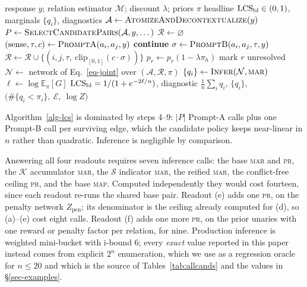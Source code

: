 \begin{algorithm}[t]
\caption{\textsc{ComputeLCS}$(y)$ --- the end-to-end coherence score.}
\label{alg-lcs}
\begin{algorithmic}[1]
\Require response $y$; relation estimator $\mathcal{M}$; discount $\lambda$; priors $\pi$
\Ensure headline $\mathrm{LCS}_{\mathrm{bl}}\in(0,1)$, marginals $\{q_i\}$, diagnostics
\State $\mathcal{A} \gets \textsc{AtomizeAndDecontextualize}(y)$
\State $P \gets \textsc{SelectCandidatePairs}(\mathcal{A}, y, \dots)$ 
\State $\mathcal{R} \gets \varnothing$
 
  \State $(\text{sense}, \tau, c) \gets \textsc{PromptA}(a_i,a_j,y)$ 
   \textbf{continue} \EndIf
  \State $\sigma \gets \textsc{PromptB}(a_i,a_j,\tau,y)$ 
  \State $\mathcal{R} \gets \mathcal{R} \cup \{(i,j,\tau,\ \mathrm{clip}_{[0,1]}(c\cdot\sigma))\}$
\EndFor
{}
   $p_r \gets p_r(1-\lambda\pi_h)$
  \Else{} mark $r$ unresolved \EndIf
\EndFor
\State $\mathcal{N} \gets$ network of Eq.~\ref{eq-joint} over $(\mathcal{A},\mathcal{R},\pi)$
\State $\{q_i\} \gets \textsc{Infer}(\mathcal{N}, \textsc{mar})$
\State $\ell \gets \log\mathbb{E}_\pi[G]$ 
\State \Return $\mathrm{LCS}_{\mathrm{bl}}=1/(1+e^{-2\ell/n})$, diagnostic $\tfrac1n\sum_i q_i$, $\{q_i\}$,
  $\bigl(\#\{q_i<\pi_i\},\ \mathcal{E},\ \log Z\bigr)$
\end{algorithmic}
\end{algorithm}

Algorithm~\ref{alg-lcs} is dominated by steps 4--9: $|P|$ Prompt-A calls plus one Prompt-B call per
surviving edge, which the candidate policy keeps near-linear in $n$ rather than quadratic. Inference
is negligible by comparison.

Answering all four readouts requires seven inference calls: the base \textsc{mar} and \textsc{pr},
the $\mathcal{K}$ accumulator \textsc{mar}, the $\mathcal{S}$ indicator \textsc{mar}, the reified
\textsc{mar}, the conflict-free ceiling \textsc{pr}, and the base \textsc{map}. Computed
independently they would cost fourteen, since each readout re-runs the shared base pair. Readout (e)
adds one \textsc{pr}, on the penalty network $Z_{\mathrm{pen}}$; its denominator is the ceiling
already computed for (d), so (a)--(e) cost eight calls. Readout (f) adds one more \textsc{pr}, on
the prior unaries with one reward or penalty factor per relation, for nine. Production
inference is weighted mini-bucket \citep{wmb} with i-bound $6$; every \emph{exact} value reported in
this paper instead comes from explicit $2^n$ enumeration, which we use as a regression oracle for
$n\le20$ and which is the source of Tables~\ref{tab:allcands} and the values in
\S\ref{sec-examples}.


